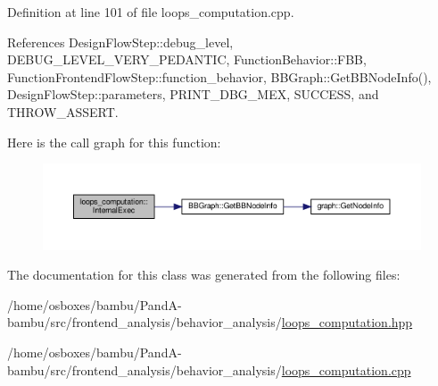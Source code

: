 Definition at line 101 of file loops\+\_\+computation.\+cpp.



References Design\+Flow\+Step\+::debug\+\_\+level, D\+E\+B\+U\+G\+\_\+\+L\+E\+V\+E\+L\+\_\+\+V\+E\+R\+Y\+\_\+\+P\+E\+D\+A\+N\+T\+IC, Function\+Behavior\+::\+F\+BB, Function\+Frontend\+Flow\+Step\+::function\+\_\+behavior, B\+B\+Graph\+::\+Get\+B\+B\+Node\+Info(), Design\+Flow\+Step\+::parameters, P\+R\+I\+N\+T\+\_\+\+D\+B\+G\+\_\+\+M\+EX, S\+U\+C\+C\+E\+SS, and T\+H\+R\+O\+W\+\_\+\+A\+S\+S\+E\+RT.

Here is the call graph for this function\+:
\nopagebreak
\begin{figure}[H]
\begin{center}
\leavevmode
\includegraphics[width=350pt]{d1/d00/classloops__computation_ad50436ee7a9e468bec203289151bd096_cgraph}
\end{center}
\end{figure}


The documentation for this class was generated from the following files\+:\begin{DoxyCompactItemize}
\item 
/home/osboxes/bambu/\+Pand\+A-\/bambu/src/frontend\+\_\+analysis/behavior\+\_\+analysis/\hyperlink{loops__computation_8hpp}{loops\+\_\+computation.\+hpp}\item 
/home/osboxes/bambu/\+Pand\+A-\/bambu/src/frontend\+\_\+analysis/behavior\+\_\+analysis/\hyperlink{loops__computation_8cpp}{loops\+\_\+computation.\+cpp}\end{DoxyCompactItemize}
